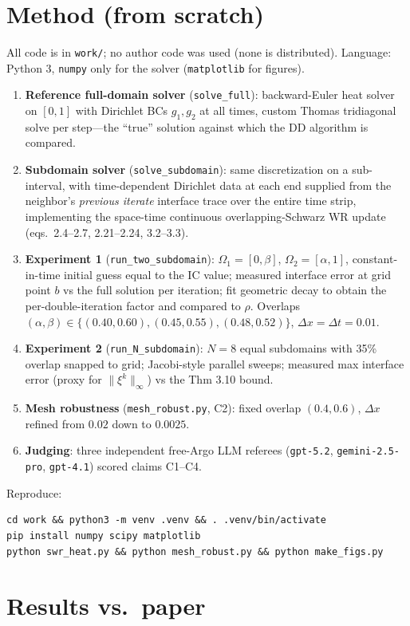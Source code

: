 \documentclass[11pt]{article}
\begin{document}
\section{Method (from scratch)}
All code is in \texttt{work/}; no author code was used (none is distributed).
Language: Python 3, \texttt{numpy} only for the solver (\texttt{matplotlib} for figures).
\begin{enumerate}
\item \textbf{Reference full-domain solver} (\texttt{solve\_full}): backward-Euler heat
solver on $[0,1]$ with Dirichlet BCs $g_1,g_2$ at all times, custom Thomas tridiagonal
solve per step---the ``true'' solution against which the DD algorithm is compared.
\item \textbf{Subdomain solver} (\texttt{solve\_subdomain}): same discretization on a
sub-interval, with time-dependent Dirichlet data at each end supplied from the neighbor's
\emph{previous iterate} interface trace over the entire time strip, implementing the
space-time continuous overlapping-Schwarz WR update (eqs.~2.4--2.7, 2.21--2.24, 3.2--3.3).
\item \textbf{Experiment 1} (\texttt{run\_two\_subdomain}): $\Omega_1=[0,\beta]$,
$\Omega_2=[\alpha,1]$, constant-in-time initial guess equal to the IC value; measured
interface error at grid point $b$ vs the full solution per iteration; fit geometric decay
to obtain the per-double-iteration factor and compared to $\rho$. Overlaps
$(\alpha,\beta) \in \{(0.40,0.60),(0.45,0.55),(0.48,0.52)\}$, $\Delta x=\Delta t = 0.01$.
\item \textbf{Experiment 2} (\texttt{run\_N\_subdomain}): $N=8$ equal subdomains with 35\%
overlap snapped to grid; Jacobi-style parallel sweeps; measured max interface error
(proxy for $\|\xi^k\|_\infty$) vs the Thm 3.10 bound.
\item \textbf{Mesh robustness} (\texttt{mesh\_robust.py}, C2): fixed overlap $(0.4,0.6)$,
$\Delta x$ refined from $0.02$ down to $0.0025$.
\item \textbf{Judging}: three independent free-Argo LLM referees
(\texttt{gpt-5.2}, \texttt{gemini-2.5-pro}, \texttt{gpt-4.1}) scored claims C1--C4.
\end{enumerate}
Reproduce:
\begin{verbatim}
cd work && python3 -m venv .venv && . .venv/bin/activate
pip install numpy scipy matplotlib
python swr_heat.py && python mesh_robust.py && python make_figs.py
\end{verbatim}

\section{Results vs.\ paper}
\end{document}
